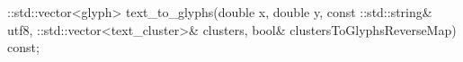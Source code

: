 %
%
\begin{itemdecl}
::std::vector<glyph> text_to_glyphs(double x, double y, const 
      ::std::string& utf8, ::std::vector<text_cluster>& clusters, bool& 
      clustersToGlyphsReverseMap) const;
\end{itemdecl}
\begin{itemdescr}
	\pnum
	\effects
	
	\pnum
	\returns
	
\end{itemdescr}
